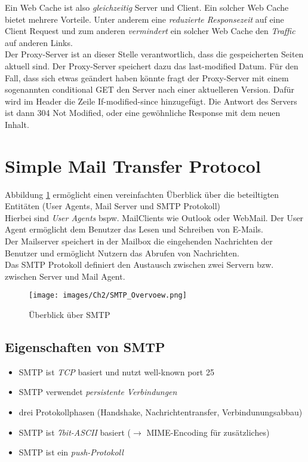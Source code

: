 \noindent Ein Web Cache ist also \emph{gleichzeitig} Server und Client. Ein solcher Web Cache bietet mehrere Vorteile. Unter anderem eine \emph{reduzierte Responsezeit} auf eine Client Request und zum anderen \emph{vermindert} ein solcher Web Cache den \emph{Traffic} auf anderen Links.\\
Der Proxy-Server ist an dieser Stelle verantwortlich, dass die gespeicherten Seiten aktuell sind. Der Proxy-Server speichert dazu das last-modified Datum. Für den Fall, dass sich etwas geändert haben könnte fragt der Proxy-Server mit einem sogenannten conditional GET den Server nach einer aktuelleren Version. Dafür wird im Header die Zeile If-modified-since hinzugefügt. Die Antwort des Servers ist dann 304 Not Modified, oder eine gewöhnliche Response mit dem neuen Inhalt.

\section{Simple Mail Transfer Protocol}
Abbildung \ref{Ch02-SMTP_Overview} ermöglicht einen vereinfachten Überblick über die beteiltigten Entitäten (User Agents, Mail Server und SMTP Protokoll)\\
\noindent Hierbei sind \emph{User Agents} bspw. MailClients wie Outlook oder WebMail. Der User Agent ermöglicht dem Benutzer das Lesen und Schreiben von E-Mails.\\
\noindent Der Mailserver speichert in der Mailbox die eingehenden Nachrichten der Benutzer und ermöglicht Nutzern das Abrufen von Nachrichten.\\
\noindent Das SMTP Protokoll definiert den Austausch zwischen zwei Servern bzw. zwischen Server und Mail Agent.
\begin{figure}[H]
    \centering
    \texttt{[image: images/Ch2/SMTP\_Overvoew.png]}
    \caption{Überblick über SMTP}
    \label{Ch02-SMTP_Overview}
\end{figure}

\subsection{Eigenschaften von SMTP}
\begin{itemize}
    \item SMTP ist \emph{TCP} basiert und nutzt well-known port 25
    \item SMTP verwendet \emph{persistente Verbindungen}
    \item drei Protokollphasen (Handshake, Nachrichtentransfer, Verbindunungsabbau)
    \item SMTP ist \emph{7bit-ASCII} basiert ($\rightarrow$ MIME-Encoding für zusätzliches)
    \item SMTP ist ein \emph{push-Protokoll}
\end{itemize}

